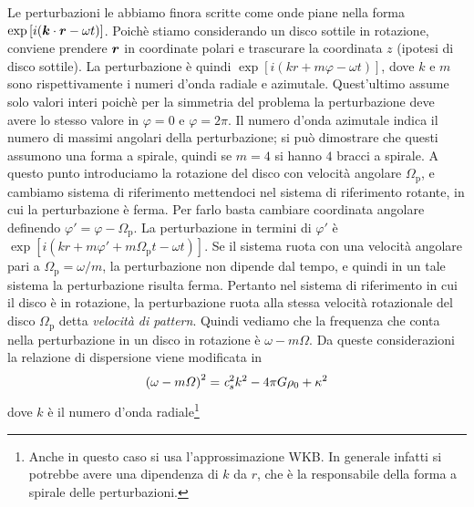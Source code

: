 Le perturbazioni le abbiamo finora scritte come onde piane nella forma $\exp\left[ i(\scal{k}{r} - \omega t) \right]$. Poichè stiamo considerando un disco sottile in rotazione, conviene prendere $\V{r}$ in coordinate polari e trascurare la coordinata $z$ (ipotesi di disco sottile). La perturbazione è quindi $\exp\left[ i(kr + m\varphi - \omega t) \right]$, dove $k$ e $m$ sono rispettivamente i numeri d'onda radiale e azimutale. Quest'ultimo assume solo valori interi poichè per la simmetria del problema la perturbazione deve avere lo stesso valore in $\varphi=0$ e $\varphi=2\pi$. Il numero d'onda azimutale indica il numero di massimi angolari della perturbazione; si può dimostrare che questi assumono una forma a spirale, quindi se $m=4$ si hanno $4$ bracci a spirale. A questo punto introduciamo la rotazione del disco con velocità angolare $\Omega_\mathrm{p}$, e cambiamo sistema di riferimento mettendoci nel sistema di riferimento rotante, in cui la perturbazione è ferma. Per farlo basta cambiare coordinata angolare definendo $\varphi' = \varphi - \Omega_\mathrm{p}$. La perturbazione in termini di $\varphi'$ è $\exp\left[ i(kr + m\varphi'+m\Omega_\mathrm{p} t - \omega t) \right]$. Se il sistema ruota con una velocità angolare pari a $\Omega_\mathrm{p}= \omega/m$, la perturbazione non dipende dal tempo, e quindi in un tale sistema la perturbazione risulta ferma. Pertanto nel sistema di riferimento in cui il disco è in rotazione, la perturbazione ruota alla stessa velocità rotazionale del disco $\Omega_\mathrm{p}$ detta \textit{velocità di pattern}. Quindi vediamo che la frequenza che conta nella perturbazione in un disco in rotazione è $\omega-m\Omega$. Da queste considerazioni la relazione di dispersione viene modificata in
\begin{equation}
\left( \omega -m\Omega\right)^2 = \textit{c}_{s}^2 k^2 - 4\pi G \rho_0 + \kappa^2
\end{equation}
dove $k$  è il numero d'onda radiale\footnote{Anche in questo caso si usa l'approssimazione WKB. In generale infatti si potrebbe avere una dipendenza di $k$ da $r$, che è la responsabile della forma a spirale delle perturbazioni.} 

